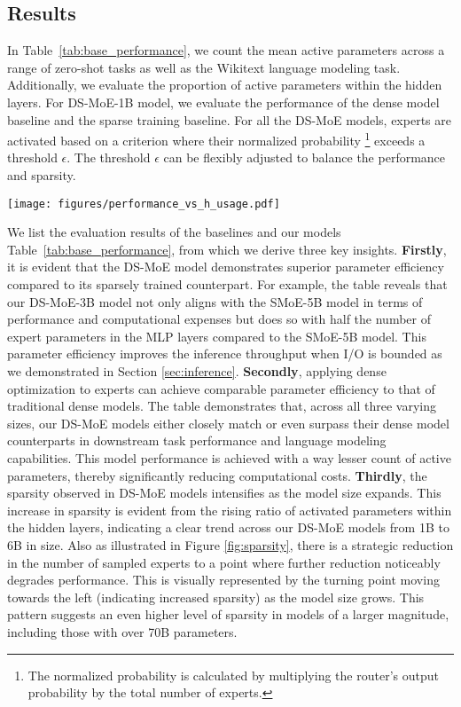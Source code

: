 \subsection{Results}\label{sec:exp-results}
In Table~\ref{tab:base_performance}, we count the mean active parameters across a range of zero-shot tasks as well as the Wikitext \cite{wikitext} language modeling task. Additionally, we evaluate the proportion of active parameters within the hidden layers. For DS-MoE-1B model, we evaluate the performance of the dense model baseline and the sparse training baseline. For all the DS-MoE models, experts are activated based on a criterion where their normalized probability
\footnote{The normalized probability is calculated by multiplying the router's output probability by the total number of experts.} 
exceeds a threshold $\epsilon$. The threshold $\epsilon$ can be flexibly adjusted to balance the performance and sparsity.

\begin{figure*}
\centering
\texttt{[image: figures/performance\_vs\_h\_usage.pdf]}
\caption{We assess the sparsity in our DS-MoEs by gradually deactivating experts to attain increasingly sparse configurations, monitoring until a significant performance drop occurs.}
\label{fig:sparsity}
\end{figure*}We list the evaluation results of the baselines and our models Table~\ref{tab:base_performance}, from which we derive three key insights.
\textbf{Firstly}, it is evident that the DS-MoE model demonstrates superior parameter efficiency compared to its sparsely trained counterpart.  For example, the table reveals that our DS-MoE-3B model not only aligns with the SMoE-5B model in terms of performance and computational expenses but does so with half the number of expert parameters in the MLP layers compared to the SMoE-5B model. This parameter efficiency improves the inference throughput when I/O is bounded as we demonstrated in Section \ref{sec:inference}.
\textbf{Secondly}, applying dense optimization to experts can achieve comparable parameter efficiency to that of traditional dense models. The table demonstrates that, across all three varying sizes, our DS-MoE models either closely match or even surpass their dense model counterparts in downstream task performance and language modeling capabilities. This model performance is achieved with a way lesser count of active parameters, thereby significantly reducing computational costs. \textbf{Thirdly}, the sparsity observed in DS-MoE models intensifies as the model size expands. This increase in sparsity is evident from the rising ratio of activated parameters within the hidden layers, indicating a clear trend across our DS-MoE models from 1B to 6B in size. Also as illustrated in Figure \ref{fig:sparsity}, there is a strategic reduction in the number of sampled experts to a point where further reduction noticeably degrades performance. This is visually represented by the turning point moving towards the left (indicating increased sparsity) as the model size grows.   This pattern suggests an even higher level of sparsity in models of a larger magnitude, including those with over 70B parameters.

